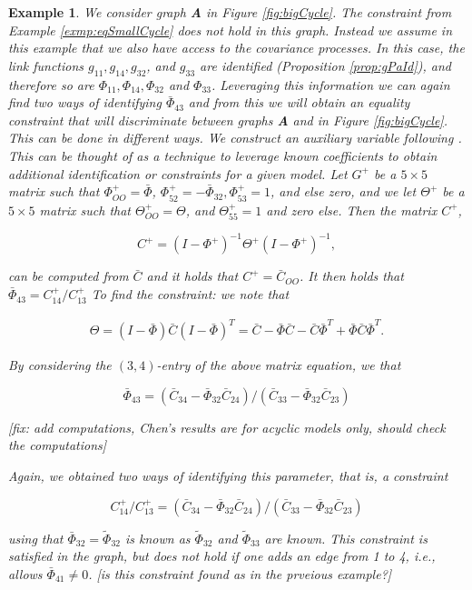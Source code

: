 \documentclass[accepted]{uai2021} %
\newtheorem{exmp}[thm]{Example}
\begin{document}
\begin{exmp}
	We consider graph \textbf{A} in Figure \ref{fig:bigCycle}. The constraint 
	from Example \ref{exmp:eqSmallCycle} does not hold in this graph. Instead 
	we assume in 
	this example that we also have access to the 
	covariance processes. In this case, the link functions 
	$g_{11},g_{14},g_{32}$, and $g_{33}$ are identified (Proposition 
	\ref{prop:gPaId}), and therefore so are $\Phi_{11}, \Phi_{14} , \Phi_{32}$ 
	and 
	$\Phi_{33}$.  Leveraging this information we can again find two ways of 
	identifying 
	$\bar{\Phi}_{43}$ and from this we will obtain an equality constraint that 
	will 
	discriminate between graphs \textbf{A} and  in 
	Figure \ref{fig:bigCycle}. This can be done in different ways. We 
	construct an {\it auxiliary 
	variable} following \cite{chenIJCAI2016, chenICML2017}. This can be thought 
	of as a technique to leverage known coefficients to obtain additional 
	identification or constraints for a given model. Let $G^+$ be a 
	$5\times 5$ 
	matrix such that $\Phi_{OO}^+ = \bar{\Phi}$, $\Phi_{52}^+ = 
	-\bar{\Phi}_{32}, \Phi_{53}^+ 
	= 1$, and else zero, and we let $\Theta^+$ be a $5\times 5$ matrix such 
	that $\Theta_{OO}^+ = \Theta$, and $\Theta_{55}^+ = 1$ and zero else. Then 
	the matrix $C^+$,
	
	$$
	C^+ = (I - \Phi^+)^{-1}\Theta^+(I-\Phi^+)^{-1},
	$$
	
	can be computed from $\bar{C}$ and it holds that 
	$C^+=\bar{C}_{OO}$. It then holds that $\bar{\Phi}_{43} = 
	C_{14}^+/C_{13}^+$
	To find the constraint: we note that
	
	\begin{align}
		\Theta = (I - \bar{\Phi})\bar{C}(I-\bar{\Phi})^T = \bar{C} - 
		\bar{\Phi}\bar{C} - \bar{C}\bar{\Phi}^T + 
		\bar{\Phi}\bar{C}\bar{\Phi}^T.
		\label{eq:expandTheta}
	\end{align}

	
	By considering the $(3,4)$-entry of the above matrix equation, we that
	
	$$
	\bar{\Phi}_{43} = (\bar{C}_{34} - 
	\bar{\Phi}_{32}\bar{C}_{24})/(\bar{C}_{33} - 
	\bar{\Phi}_{32}\bar{C}_{23})
	$$
	
	[fix: add computations, Chen's results are for acyclic models only, should 
	check the computations]
	
	
 Again, we obtained two ways of identifying 
 this parameter, that is, a constraint
 
 $$
 C_{14}^+/C_{13}^+ = (\bar{C}_{34} - 
 \bar{\Phi}_{32}\bar{C}_{24})/(\bar{C}_{33} - 
 \bar{\Phi}_{32}\bar{C}_{23})
 $$
 
 using that $\bar{\Phi}_{32} = \tilde{\Phi}_{32}$ is known as 
 $\tilde{\Phi}_{32}$ and 
 $\tilde{\Phi}_{33}$ are known. This constraint is satisfied in the graph, 
 but 
 does not hold if one adds an edge from 1 to 
 4, i.e., allows $\bar{\Phi}_{41} \neq 0$. [is this constraint found as in 
 the 
 prveious example?]
\end{exmp}
\end{document}
